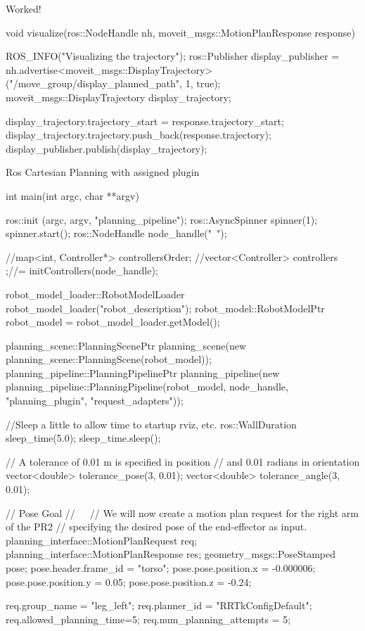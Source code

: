 Worked! \begin{DoxyVerb}void visualize(ros::NodeHandle nh, moveit_msgs::MotionPlanResponse response) {
    ROS_INFO("Visualizing the trajectory");
    ros::Publisher display_publisher = nh.advertise<moveit_msgs::DisplayTrajectory>("/move_group/display_planned_path", 1, true);
    moveit_msgs::DisplayTrajectory display_trajectory;

    display_trajectory.trajectory_start = response.trajectory_start;
    display_trajectory.trajectory.push_back(response.trajectory);
    display_publisher.publish(display_trajectory);
}
\end{DoxyVerb}


Ros Cartesian Planning with assigned plugin \begin{DoxyVerb}int main(int argc, char **argv) {
    ros::init (argc, argv, "planning_pipeline");
    ros::AsyncSpinner spinner(1);
    spinner.start();
    ros::NodeHandle node_handle("~");

    //map<int, Controller*> controllersOrder;
    //vector<Controller>  controllers ;//= initControllers(node_handle);


    robot_model_loader::RobotModelLoader robot_model_loader("robot_description");
    robot_model::RobotModelPtr robot_model = robot_model_loader.getModel();

    planning_scene::PlanningScenePtr planning_scene(new planning_scene::PlanningScene(robot_model));
    planning_pipeline::PlanningPipelinePtr planning_pipeline(new planning_pipeline::PlanningPipeline(robot_model, node_handle, "planning_plugin", "request_adapters"));

    //Sleep a little to allow time to startup rviz, etc.
    ros::WallDuration sleep_time(5.0);
    sleep_time.sleep();

    // A tolerance of 0.01 m is specified in position
    // and 0.01 radians in orientation
    vector<double> tolerance_pose(3, 0.01);
    vector<double> tolerance_angle(3, 0.01);

    // Pose Goal
    // ^^^^^^^^^
    // We will now create a motion plan request for the right arm of the PR2
    // specifying the desired pose of the end-effector as input.
    planning_interface::MotionPlanRequest req;
    planning_interface::MotionPlanResponse res;
    geometry_msgs::PoseStamped pose;
    pose.header.frame_id = "torso";
    pose.pose.position.x = -0.000006;
    pose.pose.position.y = 0.05;
    pose.pose.position.z = -0.24;

    req.group_name = "leg_left";
    req.planner_id = "RRTkConfigDefault";
    req.allowed_planning_time=5;
    req.num_planning_attempts = 5;

}
\end{DoxyVerb}
